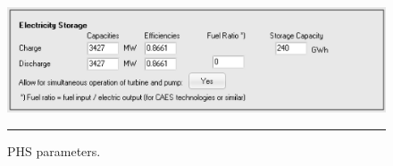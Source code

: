 \begin{figure}[htbp]
	\centering
	\includegraphics[width=\textwidth]{figures/B02_PHS.png}
	\rule{\textwidth}{0.5pt} %
	\caption{PHS parameters.}
	\label{fig:B02-PHS}
\end{figure}